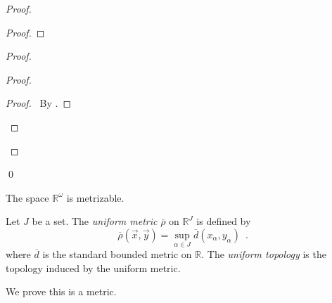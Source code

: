 \begin{proof}
\begin{proof}
  \end{proof}
  \begin{proof}
    \begin{proof}
      \qedstep
      \begin{proof}
        \pf\ By .
      \end{proof}
    \end{proof}
  \end{proof}
  \qed
\end{proof}

\begin{cor}
  The space $\mathbb{R}^\omega$ is metrizable.
\end{cor}

\begin{df}
  Let $J$ be a set. The \emph{uniform metric} $\overline{\rho}$ on
  $\mathbb{R}^J$ is defined by
  \[ \overline{\rho}(\vec{x}, \vec{y}) = \sup_{\alpha \in J}
  \overline{d}(x_\alpha, y_\alpha) \enspace . \]
  where $\overline{d}$ is the standard bounded metric on $\mathbb{R}$. The
  \emph{uniform topology} is the topology induced by the uniform metric.

  We prove this is a metric.
\end{df}

